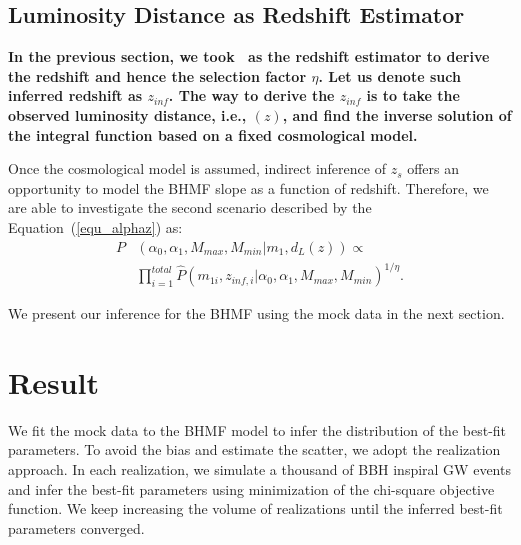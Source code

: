 \documentclass[twocolumn]{aastex62}
\begin{document}
\subsection{Luminosity Distance as Redshift Estimator} 
\label{sec_dl_z}
{\bf In the previous section, we took \dl\ as the redshift estimator to derive the redshift and hence the selection factor $\eta$. Let us denote such inferred redshift as $z_{inf}$. The way to derive the $z_{inf}$ is to take the observed luminosity distance, i.e.,  \dl$(z)$, and find the inverse solution of the integral function based on a fixed cosmological model.}

Once the cosmological model is assumed, indirect inference of $z_s$ offers an opportunity to model the BHMF slope as a function of redshift. Therefore, we are able to investigate the second scenario described by the Equation~(\ref{equ_alphaz}) as:
 \begin{equation} \label{equ_lik_alphaz}
 \begin{split}
 P&(\alpha_0, \alpha_1, M_{max}, M_{min}|m_{1},d_L(z)) \propto \\
  &\prod_{i=1}^{total} \hat{P}(m_{1i}, z_{inf,i} |\alpha_0, \alpha_1, M_{max}, M_{min})^{1/\eta}.
  \end{split}
 \end{equation}
 
 We present our inference for the BHMF using the mock data in the next section. 


\vspace{1cm}
\section{Result}\label{sec_result}
We fit the mock data to the BHMF model to infer the distribution of the best-fit parameters. To avoid the bias and estimate the scatter, we adopt the realization approach. In each realization, we simulate a thousand of BBH inspiral GW events and infer the best-fit parameters using minimization of the chi-square objective function. We keep increasing the volume of realizations until the inferred best-fit parameters converged.
\end{document}

